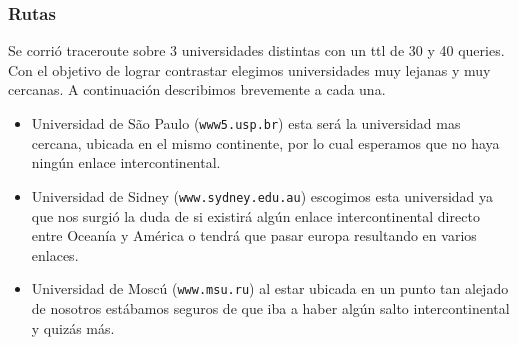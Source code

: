 \subsubsection*{Rutas}
Se corrió traceroute sobre 3 universidades distintas con un ttl de 30 y 40 queries. Con el objetivo de lograr contrastar elegimos universidades muy lejanas y muy cercanas. A continuación describimos brevemente a cada una.

\begin{itemize}
	\item Universidad de São Paulo (\texttt{www5.usp.br}) esta será la universidad mas cercana, ubicada en el mismo continente, por lo cual esperamos que no haya ningún enlace intercontinental.
	\item Universidad de Sidney (\texttt{www.sydney.edu.au}) escogimos esta universidad ya que nos surgió la duda de si existirá algún enlace intercontinental directo entre Oceanía y América o tendrá que pasar europa resultando en varios enlaces.
	\item Universidad de Moscú (\texttt{www.msu.ru}) al estar ubicada en un punto tan alejado de nosotros estábamos seguros de que iba a haber algún salto intercontinental y quizás más.
\end{itemize}
